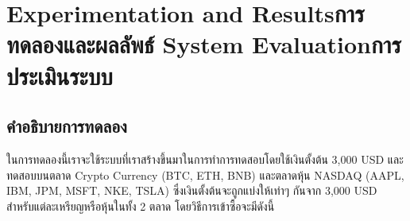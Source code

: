 \def\checkmark{\tikz\fill[scale=0.4](0,.35) -- (.25,0) -- (1,.7) -- (.25,.15) -- cycle;}

\chapter{\ifproject%
      \ifenglish Experimentation and Results\else การทดลองและผลลัพธ์\fi
  \else%
      \ifenglish System Evaluation\else การประเมินระบบ\fi
  \fi}

\section{คำอธิบายการทดลอง}
ในการทดลองนี้เราจะใช้ระบบที่เราสร้างขึ้นมาในการทำการทดสอบโดยใช้เงินตั้งต้น 3,000 USD และทดสอบบนตลาด Crypto Currency (BTC, ETH, BNB) และตลาดหุ้น NASDAQ (AAPL, IBM, JPM, MSFT, NKE, TSLA) ซึ่งเงินตั้งต้นจะถูกแบ่งให้เท่าๆ กันจาก 3,000 USD สำหรับแต่ละเหรียญหรือหุ้นในทั้ง 2 ตลาด โดยวิธีการเข้าซื้อจะมีดังนี้


